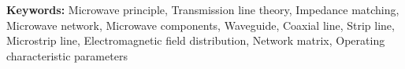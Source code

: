 \noindent \textbf{Keywords:}
Microwave principle,
Transmission line theory,
Impedance matching,
Microwave network,
Microwave components,
Waveguide,
Coaxial line,
Strip line,
Microstrip line,
Electromagnetic field distribution,
Network matrix,
Operating characteristic parameters

